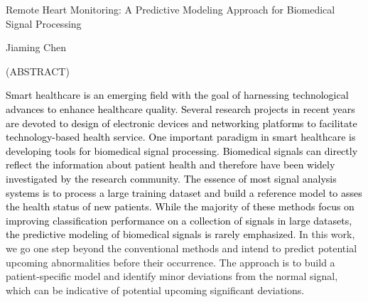 
\begin{center}

\vfill

{\large Remote Heart Monitoring: A Predictive Modeling Approach for Biomedical Signal Processing }


Jiaming Chen

{(ABSTRACT)}




\vfill

\end{center}

\textcolor{black}{Smart healthcare is an emerging field with the goal of harnessing technological advances to enhance healthcare quality. Several research projects in recent years are devoted to design of electronic devices and networking platforms to facilitate technology-based health service. One important paradigm in smart healthcare is developing tools for biomedical signal processing. Biomedical signals can directly reflect the information about patient health and therefore have been widely investigated by the research community. The essence of most signal analysis systems is to process a large training dataset and build a reference model to asses the health status of new patients. While the majority of these methods focus on improving classification performance on a collection of signals in large datasets, the predictive modeling of biomedical signals is rarely emphasized.} %
In this work, we go one step beyond the conventional methods and intend to predict potential upcoming abnormalities before their occurrence. The approach is to build a patient-specific model and identify minor deviations from the normal signal, which can be indicative of potential upcoming significant deviations. 

